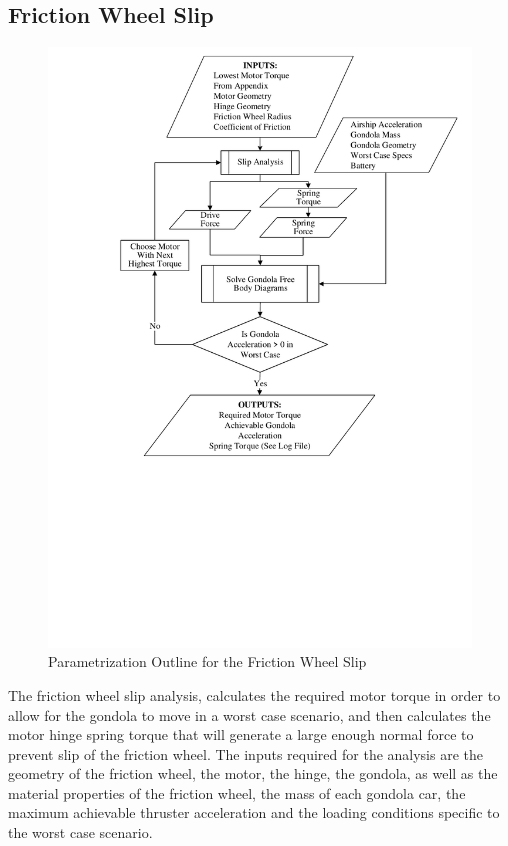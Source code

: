 \documentclass[../main.tex]{subfiles}
\begin{document}
\subsection{Friction Wheel Slip} \label{frictionSlip}
\begin{figure}[H]
	\centering
	\includegraphics[width=.9\linewidth]{img/paramaterization/fricWheelSlip.pdf}
	\caption{Parametrization Outline for the Friction Wheel Slip}
	\label{fig:frictionWheelParametrization}
\end{figure}

The friction wheel slip analysis, calculates the required motor torque in order to allow for the gondola to move in a worst case scenario, and then calculates the motor hinge spring torque that will generate a large enough normal force to prevent slip of the friction wheel. The inputs required for the analysis are the geometry of the friction wheel, the motor, the hinge, the gondola, as well as the material properties of the friction wheel, the mass of each gondola car, the maximum achievable thruster acceleration and the loading conditions specific to the worst case scenario. \\
\end{document}
